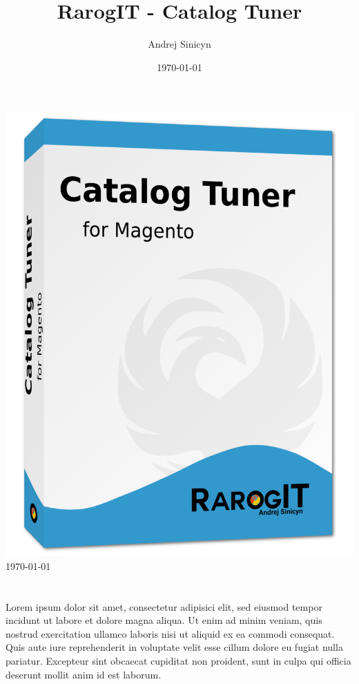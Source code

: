 \documentclass[12pt]{report}
\date{\today}
\author{Andrej Sinicyn}
\title{RarogIT - Catalog Tuner}
\begin{document}
\begin{titlepage}
\begin{center}
\includegraphics[width=1\textwidth]{../media/box/cataolg-tuner-box.png}\\
\today
\end{center}
\end{titlepage}
\tableofcontents
\chapter{
         }
Lorem ipsum dolor sit amet, consectetur adipisici elit, sed eiusmod tempor incidunt ut labore et dolore magna aliqua. Ut enim ad minim veniam, quis nostrud exercitation ullamco laboris nisi ut aliquid ex ea commodi consequat. Quis aute iure reprehenderit in voluptate velit esse cillum dolore eu fugiat nulla pariatur. Excepteur sint obcaecat cupiditat non proident, sunt in culpa qui officia deserunt mollit anim id est laborum.\\
\end{document}
